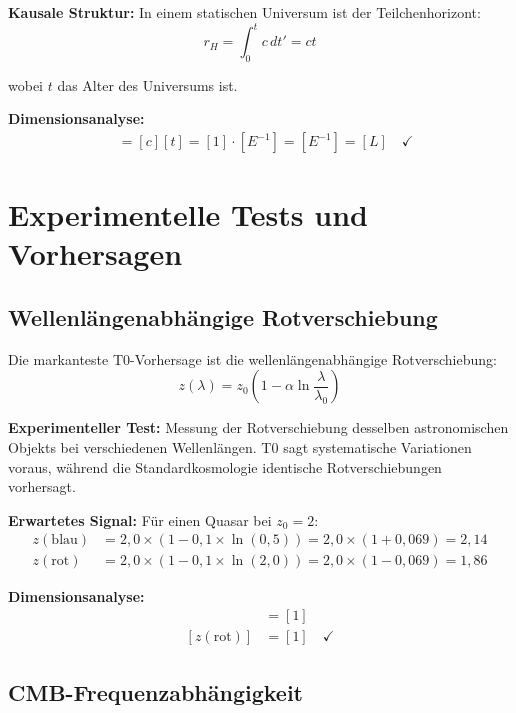 \documentclass[12pt,a4paper]{report}
\begin{document}
	\textbf{Kausale Struktur:}
	In einem statischen Universum ist der Teilchenhorizont:
	\begin{equation}
		r_H = \int_0^t c \, dt' = ct
	\end{equation}
	
	wobei $t$ das Alter des Universums ist.
	
	\textbf{Dimensionsanalyse:}
	\begin{align}
		[r_H] &= [c][t] = [1] \cdot [E^{-1}] = [E^{-1}] = [L] \quad \checkmark
	\end{align}
	
	\section{Experimentelle Tests und Vorhersagen}
	\label{sec:experimental_tests}
	
	\subsection{Wellenlängenabhängige Rotverschiebung}
	\label{subsec:wavelength_redshift_test}
	
	Die markanteste T0-Vorhersage ist die wellenlängenabhängige Rotverschiebung:
	\begin{equation}
		z(\lambda) = z_0\left(1 - \alpha \ln\frac{\lambda}{\lambda_0}\right)
	\end{equation}
	
	\textbf{Experimenteller Test:}
	Messung der Rotverschiebung desselben astronomischen Objekts bei verschiedenen Wellenlängen. T0 sagt systematische Variationen voraus, während die Standardkosmologie identische Rotverschiebungen vorhersagt.
	
	\textbf{Erwartetes Signal:}
	Für einen Quasar bei $z_0 = 2$:
	\begin{align}
		z(\text{blau}) &= 2,0 \times (1 - 0,1 \times \ln(0,5)) = 2,0 \times (1 + 0,069) = 2,14 \\
		z(\text{rot}) &= 2,0 \times (1 - 0,1 \times \ln(2,0)) = 2,0 \times (1 - 0,069) = 1,86
	\end{align}
	
	\textbf{Dimensionsanalyse:}
	\begin{align}
		[z(\text{blau})] &= [1] \\
		[z(\text{rot})] &= [1] \quad \checkmark
	\end{align}
	
	\subsection{CMB-Frequenzabhängigkeit}
	\label{subsec:cmb_frequency_dependence}
	
\end{document}

